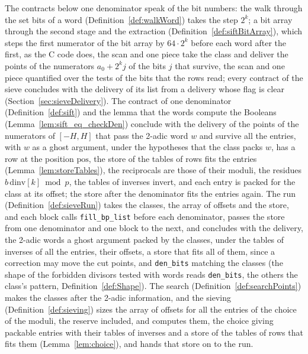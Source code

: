 The contracts below one denominator speak of the bit numbers: the walk through the set bits of a
word (Definition~\ref{def:walkWord}) takes the step $2^k$; a bit array through the second stage and
the extraction (Definition~\ref{def:siftBitArray}), which steps the first numerator of the bit array
by $64 \cdot 2^k$ before each word after the first, as the C code does, the scan and one piece take
the class and deliver the points of the numerators $a_0 + 2^k j$ of the bits $j$ that survive, the
scan and one piece quantified over the tests of the bits that the rows read; every contract of the
sieve concludes with the delivery of its list from a delivery whose flag is clear
(Section~\ref{sec:sieveDelivery}). The contract of one denominator (Definition~\ref{def:sift}) and
the lemma that the words compute the Booleans (Lemma~\ref{lem:sift_eq_checkDen}) conclude with the
delivery of the points of the numerators of $[-H, H]$ that pass the 2-adic word $w$ and survive all
the entries, with $w$ as a ghost argument, under the hypotheses that the class packs $w$, has a row
at the position $\mathrm{pos}$, the store of the tables of rows fits the entries
(Lemma~\ref{lem:storeTables}), the reciprocals are those of their moduli, the residues
$b\,\mathrm{dinv}[k] \bmod p$, the tables of inverses invert, and each entry is packed for the class
at its offset; the store after the denominator fits the entries again. The run
(Definition~\ref{def:sieveRun}) takes the classes, the array of offsets and the store, and each
block calls \verb|fill_bp_list| before each denominator, passes the store from one denominator and
one block to the next, and concludes with the delivery, the 2-adic words a ghost argument packed by
the classes, under the tables of inverses of all the entries, their offsets, a store that fits all
of them, since a correction may move the cut points, and \verb|den_bits| matching the classes (the
shape of the forbidden divisors tested with words reads \verb|den_bits|, the others the class's
pattern, Definition~\ref{def:Shape}). The search (Definition~\ref{def:searchPoints}) makes the
classes after the 2-adic information, and the sieving (Definition~\ref{def:sieving}) sizes the array
of offsets for all the entries of the choice of the moduli, the reserve included, and computes them,
the choice giving packable entries with their tables of inverses and a store of the tables of rows
that fits them (Lemma~\ref{lem:choice}), and hands that store on to the run.

